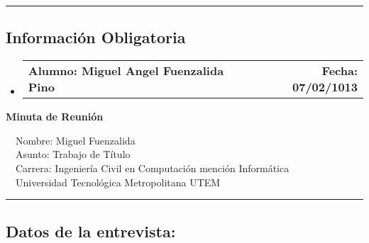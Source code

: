\documentclass[10pt,letterpaper]{article}
\makeatletter
\newcommand{\headerrow}[2]
{\begin{tabular*}{\linewidth}{l@{\extracolsep{\fill}}r}
	#1 &
	#2 \\
\end{tabular*}}
\makeatother
\begin{document}
\hrule
\vspace{-0.4em}
\subsection*{Información Obligatoria}

\begin{itemize}
	\parskip=0.1em

	\item 
	\headerrow
		{\textbf{Alumno: Miguel Angel Fuenzalida Pino}}
		{\textbf{Fecha: 07/02/1013}}

\end{itemize}
\newpage
\begin{center}
{\LARGE \textbf{Minuta de Reunión}}

\ \ \textbullet Nombre: Miguel Fuenzalida
\\
\ \ \textbullet Asunto: Trabajo de Título
\\
\ \ \textbullet Carrera: Ingeniería Civil en Computación mención Informática
\\
\ \ \textbullet Universidad Tecnológica Metropolitana UTEM
\end{center}

\hrule
\vspace{-0.4em}
\subsection*{Datos de la entrevista:}
\end{document}
